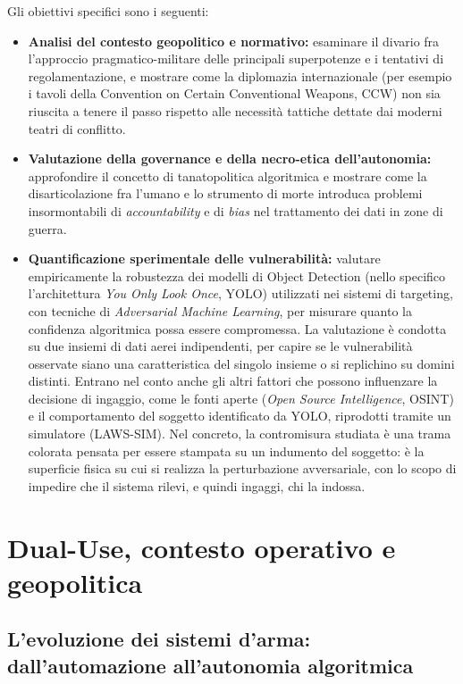 \ifstampa\documentclass[a4paper,12pt,twoside,openright]{report}\else\documentclass[a4paper,12pt]{report}\fi
\newif\ifrevisione \revisionefalse
\DeclareRobustCommand{\rev}[1]{\ifrevisione{\color{blue!65!black}#1}\else#1\fi}
\begin{document}
Gli obiettivi specifici sono i seguenti:
\begin{itemize}
    \item \textbf{\rev{Analisi del contesto geopolitico e normativo:}} esaminare il divario fra l'approccio pragmatico-militare delle principali superpotenze e i tentativi di regolamentazione, e mostrare come la diplomazia internazionale (per esempio i tavoli della Convention on Certain Conventional Weapons, CCW) non sia riuscita a tenere il passo rispetto alle necessità tattiche dettate dai moderni teatri di conflitto.
    \item \textbf{Valutazione della governance e della necro-etica dell'autonomia:} approfondire il concetto di tanatopolitica algoritmica e mostrare come la disarticolazione fra l'umano e lo strumento di morte introduca problemi insormontabili di \textit{accountability} e di \textit{bias} nel trattamento dei dati in zone di guerra.
    \item \textbf{Quantificazione sperimentale delle vulnerabilità:} valutare empiricamente la robustezza dei modelli di Object Detection (nello specifico l'architettura \textit{You Only Look Once}, YOLO) utilizzati nei sistemi di targeting, con tecniche di \textit{Adversarial Machine Learning}\rev{, per misurare quanto la confidenza algoritmica possa essere compromessa}. La valutazione è condotta su due \rev{insiemi di dati} aerei indipendenti, per capire se le vulnerabilità osservate siano una caratteristica del singolo \rev{insieme} o si replichino su domini distinti. Entrano nel conto anche gli altri fattori che possono influenzare la decisione di \rev{ingaggio}, come le fonti aperte (\textit{Open Source Intelligence}, OSINT) e il comportamento del soggetto identificato da YOLO, riprodotti tramite un simulatore (LAWS-SIM).
    \rev{Nel concreto, la contromisura studiata è una trama colorata pensata per essere stampata su un indumento del soggetto: è la superficie fisica su cui si realizza la perturbazione avversariale, con lo scopo di impedire che il sistema rilevi, e quindi ingaggi, chi la indossa.}  
\end{itemize}
\chapter{Dual-Use, contesto operativo e geopolitica}
\label{cap1}
 
\section{L'evoluzione dei sistemi d'arma: dall'automazione all'autonomia algoritmica}
 
\end{document}
